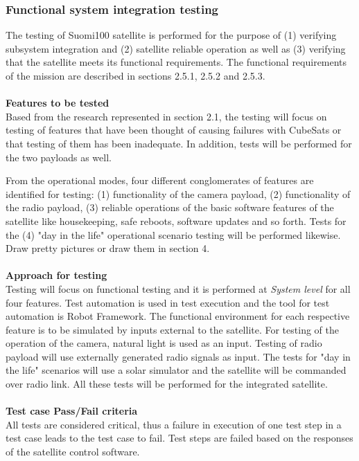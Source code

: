 \documentclass[english,12pt,a4paper,pdftex,elec,utf8]{aaltothesis}
\begin{document}
\subsubsection{Functional system integration testing}
The testing of Suomi100 satellite is performed for the purpose of (1) verifying subsystem integration and (2) satellite reliable operation as well as (3) verifying that the satellite meets its functional requirements. The functional requirements of the mission are described in 
sections 2.5.1, 2.5.2 and 2.5.3. 
\\
\\
\textbf{Features to be tested} 
\\
Based from the research represented in section 2.1, the testing will focus on testing of features that have been thought of causing failures with CubeSats or that testing of them has been inadequate. In addition, tests will be performed for the two payloads as well.\par
From the operational modes, four different conglomerates of features are identified for testing: (1) functionality of the camera payload, (2) functionality of the radio payload, (3) reliable operations of the basic software features of the satellite like housekeeping, safe reboots, software updates and so forth. Tests for the (4) "day in the life" operational scenario testing will be performed likewise.
\\
Draw pretty pictures or draw them in section 4.
\\
\\
\textbf{Approach for testing} 
\\
Testing will focus on functional testing and it is performed at \textit{System level} for all four features. Test automation is used in test execution and the tool for test automation is Robot Framework. The functional environment for each respective feature is to be simulated by inputs external to the satellite. For testing of the operation of the camera, natural light is used as an input. Testing of radio payload will use externally generated radio signals as input. The tests for "day in the life" scenarios will use a solar simulator and the satellite will be commanded over radio link. All these tests will be performed for the integrated satellite.
\\
\\
\textbf{Test case Pass/Fail criteria} 
\\
All tests are considered critical, thus a failure in execution of one test step in a test case leads to the test case to fail. Test steps are failed based on the responses of the satellite control software. 
\end{document}
